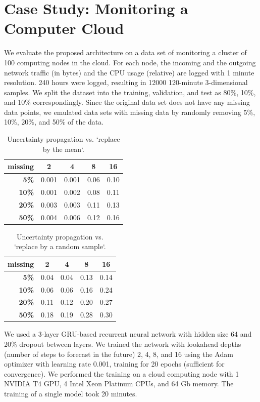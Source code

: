 \documentclass[runningheads]{llncs}
\begin{document}
\section{Case Study: Monitoring a Computer Cloud}

We evaluate the proposed architecture on a data set of
monitoring a cluster of 100 computing nodes in the cloud. For
each node, the incoming and the outgoing network traffic (in
bytes) and the CPU usage (relative) are logged with 1 minute
resolution. 240 hours were logged, resulting in 12000 120-minute
3-dimensional samples.  We split the dataset into the training,
validation, and test as 80\%, 10\%, and 10\% correspondingly.
Since the original data set does not have any missing data
points, we emulated data sets with missing data by randomly
removing 5\%, 10\%, 20\%, and 50\% of the data.

\begin{table}[t]
\caption{Uncertainty propagation vs. `replace by the mean`.}
\label{tab:replace-by-mean}
	\setlength\tabcolsep{18pt}
	\centering
	\begin{tabular}{r|c c c c}
	 \textbf{missing} & \textbf{2} & \textbf{4} & \textbf{8} & \textbf{16} \\ \hline
		  \textbf{5\%} & 0.001 & 0.001 &  0.06 & 0.10  \\
		 \textbf{10\%} & 0.001 & 0.002 &  0.08 & 0.11  \\
		 \textbf{20\%} & 0.003 & 0.003 &  0.11 & 0.13  \\
		 \textbf{50\%} & 0.004 & 0.006 &  0.12 & 0.16  
	\end{tabular}
\end{table}
\begin{table}[t]
\caption{Uncertainty propagation vs. `replace by a random sample`.}
\vspace{1em}
\label{tab:replace-by-sample}
	\setlength\tabcolsep{18pt}
	\centering
	\begin{tabular}{r|c c c c}
	 \textbf{missing} & \textbf{2} & \textbf{4} & \textbf{8} & \textbf{16} \\ \hline
		  \textbf{5\%} & 0.04 & 0.04 & 0.13 & 0.14 \\
		 \textbf{10\%} & 0.06 & 0.06 & 0.16 & 0.24 \\
		 \textbf{20\%} & 0.11 & 0.12 & 0.20 & 0.27 \\
		 \textbf{50\%} & 0.18 & 0.19 & 0.28 & 0.30   
	\end{tabular}
\end{table}
We used a 3-layer GRU-based recurrent neural network with hidden
size 64 and 20\% dropout between layers. We trained the network
with lookahead depths (number of steps to forecast in the
future) 2, 4, 8, and 16 using the Adam optimizer with learning
rate 0.001, training for 20 epochs (sufficient for convergence).
We performed the training on a cloud computing node with 1
NVIDIA T4 GPU, 4 Intel Xeon Platinum CPUs, and 64 Gb memory. The
training of a single model took 20 minutes.
\end{document}
